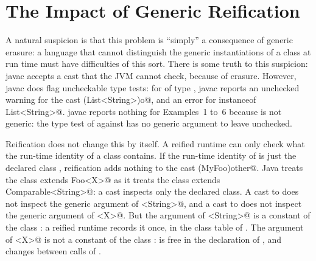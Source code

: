 \section{The Impact of Generic Reification}
A natural suspicion is that this problem is ``simply'' a consequence of generic erasure:
a language that cannot distinguish the generic instantiations of a class at run time must have difficulties of this sort.
There is some truth to this suspicion: javac accepts a cast that the JVM cannot check, because of erasure.
However, javac does flag uncheckable type tests:
for \Q@o@ of type \Q@Object@, javac reports an unchecked warning for the cast \Q@(List<String>)o@, and an error for \Q@o instanceof List<String>@.
javac reports nothing for Examples~1 to~6 because \Q@MyFoo@ is not generic:
the type test of \Q@other@ against \Q@MyFoo@ has no generic argument to leave unchecked.

Reification does not change this by itself.
A reified runtime can only check what the run-time identity of a class contains.
If the run-time identity of \Q@MyFoo@ is just the declared class \Q@MyFoo@, reification adds nothing to the cast \Q@(MyFoo)other@.
Java treats the class \Q@MyFoo extends Foo<X>@ as it treats the class \Q@String extends Comparable<String>@: a cast inspects only the declared class.
A cast to \Q@String@ does not inspect the generic argument of \Q@Comparable<String>@,
and a cast to \Q@MyFoo@ does not inspect the generic argument of \Q@Foo<X>@.
But the argument \Q@String@ of \Q@Comparable<String>@ is a constant of the class \Q@String@: a reified runtime records it once, in the class table of \Q@String@.
The argument \Q@X@ of \Q@Foo<X>@ is not a constant of the class \Q@MyFoo@: \Q@X@ is free in the declaration of \Q@MyFoo@, and \Q@X@ changes between calls of \Q@m@.

